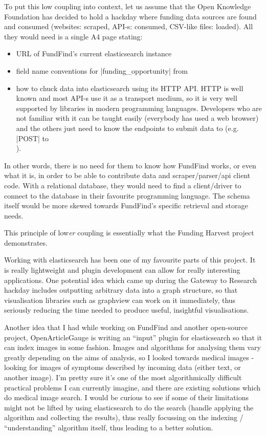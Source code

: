 To put this low coupling into context, let us assume that the Open Knowledge Foundation has decided to hold a hackday where funding data sources are found and consumed (websites: scraped, API-s: consumed, CSV-like files: loaded). All they would need is a single A4 page stating:
\begin{itemize}
\item URL of FundFind's current elasticsearch instance
\item field name conventions for |funding_opportunity| from 
\item how to chuck data into elasticsearch using its HTTP API. HTTP is well known and most API-s use it as a transport medium, so it is very well supported by libraries in modern programming languages. Developers who are not familiar with it can be taught easily (everybody has used a web browser) and the others just need to know the endpoints to submit data to (e.g. |POST| to \\ ).
\end{itemize}

In other words, there is no need for them to know how FundFind works, or even what it is, in order to be able to contribute data and scraper/parser/api client code. With a relational database, they would need to find a client/driver to connect to the database in their favourite programming language. The schema itself would be more skewed towards FundFind's specific retrieval and storage needs.

This principle of low\emph{er} coupling is essentially what the Funding Harvest project demonstrates.

Working with elasticsearch has been one of my favourite parts of this project. It is really lightweight and plugin development can allow for really interesting applications. One potential idea which came up during the Gateway to Research hackday includes outputting arbitrary data into a graph structure, so that visualisation libraries such as graphview \cite{graphview} can work on it immediately, thus seriously reducing the time needed to produce useful, insightful visualisations.

Another idea that I had while working on FundFind and another open-source project, OpenArticleGauge \cite{oag} is writing an ``input'' plugin for elasticsearch so that it can index images in some fashion. Images and algorithms for analysing them vary greatly depending on the aims of analysis, so I looked towards medical images - looking for images of symptoms described by incoming data (either text, or another image). I'm pretty sure it's one of the most algorithmically difficult practical problems I can currently imagine, and there are existing solutions which do medical image search. I would be curious to see if some of their limitations might not be lifted by using elasticsearch to do the search (handle applying the algorithm and collecting the results), thus really focussing on the indexing / ``understanding'' algorithm itself, thus leading to a better solution.

